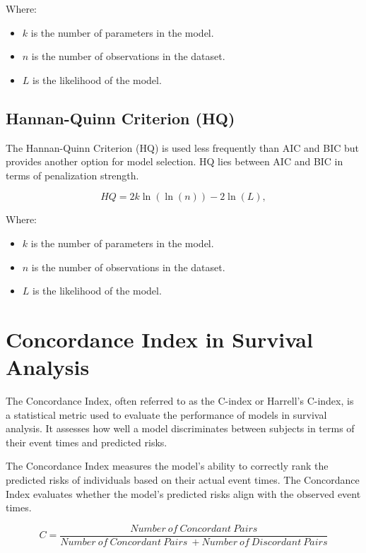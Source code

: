 \documentclass[doublespacing]{report} [12px]%
\begin{document}
Where:
\begin{itemize}
    \item \(k\) is the number of parameters in the model.
    \item \(n\) is the number of observations in the dataset.
    \item \(L\) is the likelihood of the model.
\end{itemize}

\subsection{Hannan-Quinn Criterion (HQ)}

The Hannan-Quinn Criterion (HQ) is used less frequently than AIC and BIC but provides another option for model selection. HQ lies between AIC and BIC in terms of penalization strength.

\begin{equation}
HQ = 2k\ln(\ln(n)) - 2\ln(L),
\end{equation}

Where:
\begin{itemize}
    \item \(k\) is the number of parameters in the model.
    \item \(n\) is the number of observations in the dataset.
    \item \(L\) is the likelihood of the model.
\end{itemize}


\section{Concordance Index in Survival Analysis}

The Concordance Index, often referred to as the C-index or Harrell's C-index, is a statistical metric used to evaluate the performance of models in survival analysis. It assesses how well a model discriminates between subjects in terms of their event times and predicted risks. 

The Concordance Index measures the model's ability to correctly rank the predicted risks of individuals based on their actual event times. The Concordance Index evaluates whether the model's predicted risks align with the observed event times.

\begin{equation}
C=\frac{Number\ of\ Concordant\ Pairs}{Number\ of\ Concordant\ Pairs\ +Number\ of\ Discordant\ Pairs}
\end{equation}
\end{document}
